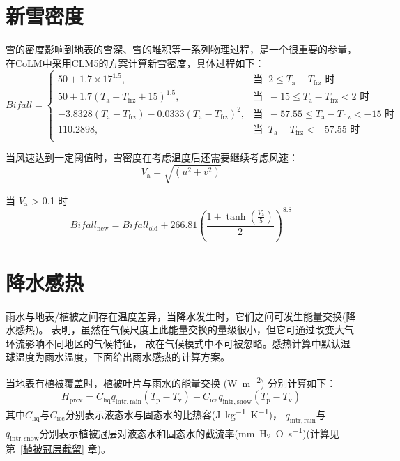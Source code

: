 \section{新雪密度}
雪的密度影响到地表的雪深、雪的堆积等一系列物理过程，是一个很重要的参量，在CoLM中采用CLM5的方案计算新雪密度，具体过程如下：
\begin{equation*}
  Bifall= \begin{cases}
    50 + 1.7\times 17^{1.5}, & \text{当 }\ 2\leqslant T_{\mathrm {a}} - T_{\mathrm{frz}} \text{ 时}\\
    50 + 1.7(T_{\mathrm {a}} - T_{\mathrm{frz}}+15)^{1.5}, & \text{当 }\ -15\leqslant T_{\mathrm {a}} - T_{\mathrm{frz}} < 2 \text{ 时} \\
    -3.8328(T_{\mathrm {a}} - T_{\mathrm{frz}}) - 0.0333(T_{\mathrm {a}} - T_{\mathrm{frz}})^2, & \text{当 }\ -57.55\leqslant T_{\mathrm {a}} - T_{\mathrm{frz}} < -15 \text{ 时} \\
    110.2898, & \text{当 }\ T_{\mathrm {a}} - T_{\mathrm{frz}} < -57.55 \text{ 时}\\
  \end{cases}
\end{equation*}

当风速达到一定阈值时，雪密度在考虑温度后还需要继续考虑风速：
\begin{equation}
  V_{\mathrm {a}} = \sqrt{(u^2 + v^2)}
\end{equation}

当 $V_{\mathrm {a}}$ > 0.1 时
\begin{equation}
  Bifall_{\mathrm{new}} = Bifall_{\mathrm{old}} + 266.81{\left(\frac{1 + \tanh (\frac{V_{\mathrm {a}}}{5})}{2}\right)}^{8.8}
\end{equation}


\section{降水感热}\label{植被地表的雨水感热}
雨水与地表/植被之间存在温度差异，当降水发生时，它们之间可发生能量交换(降水感热)。
\citet{wei2014impact} 表明，虽然在气候尺度上此能量交换的量级很小，但它可通过改变大气环流影响不同地区的气候特征，
故在气候模式中不可被忽略。感热计算中默认湿球温度为雨水温度，下面给出雨水感热的计算方案。

当地表有植被覆盖时，植被叶片与雨水的能量交换 (\unit{W.m^{-2}}) 分别计算如下：
\begin{equation}
  H_{\mathrm{prcv}}=C_{\mathrm{liq}} q_{\mathrm{intr,rain}}\left(T_{\mathrm{p}}-T_{\mathrm{v}}\right)+C_{\mathrm{ice}} q_{\mathrm{intr,snow}}\left(T_{\mathrm{p}}-T_{\mathrm{v}}\right)
\end{equation}
其中$C_{\mathrm{liq}}$与$C_{\mathrm{ice}}$分别表示液态水与固态水的比热容(\unit{J.kg^{-1}.K^{-1}})，
$q_{\mathrm{intr,rain}}$与$q_{\mathrm{intr,snow}}$分别表示植被冠层对液态水和固态水的截流率(\unit{mm.H_2O.s^{-1}})(计算见第~\ref{植被冠层截留} 章)。



